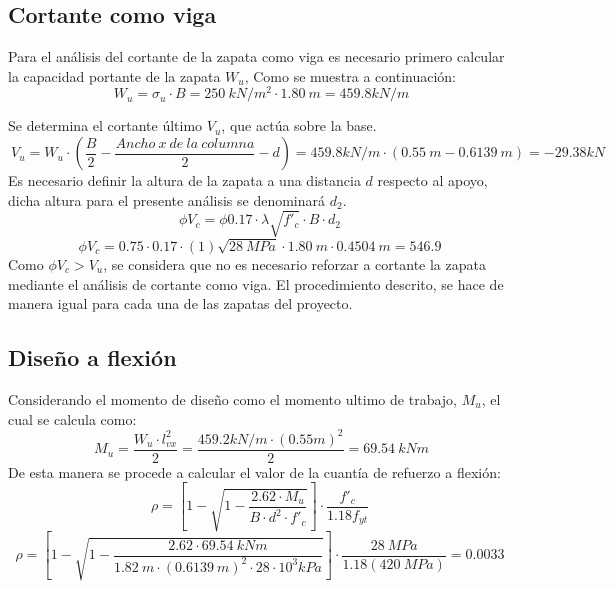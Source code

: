 \documentclass[12pt]{article}
\begin{document}
\subsection{Cortante como viga}
Para el análisis del cortante de la zapata como viga es necesario primero calcular la capacidad portante de la zapata $W_{u}$, Como se muestra a continuación:
\begin{equation*}
    \ W_{u}=\sigma_{u}\cdot B = 250~kN/m^2\cdot1.80~m=459.8 kN/m
\end{equation*}

Se determina el cortante último $V_{u}$, que actúa sobre la base.
\begin{equation*}
    \ V_{u}=W_{u}\cdot \left(\frac{B}{2}-\frac{Ancho~x~de~la~columna}{2}-d \right)=459.8 kN/m\cdot(0.55~m-0.6139~m)=-29.38kN
\end{equation*}
Es necesario definir la altura de la zapata a una distancia $d$  respecto al apoyo, dicha altura para el presente análisis se denominará $d_{2}$.
\begin{equation*}
    \phi V_{c}=\phi 0.17\cdot\lambda\sqrt{f'_{c}}\cdot B \cdot d_{2}
\end{equation*}
\begin{equation*}
    \phi V_{c}=0.75\cdot 0.17\cdot(1)\sqrt{28~MPa}\cdot 1.80~m \cdot 0.4504~m=546.9 
\end{equation*}
Como $\phi V_{c}>V_{u}$, se considera que no es necesario reforzar a cortante la zapata  mediante el análisis de cortante como viga.
El procedimiento descrito, se hace de manera igual para cada una de las zapatas del proyecto.
\subsection{Diseño a flexión}
Considerando el momento de diseño como el momento ultimo de trabajo, $M_{u}$,  el cual se calcula como:
\begin{equation*}
    \ M_{u}=\frac{W_{u}\cdot l_{vx}^2}{2}=\frac{459.2kN/m\cdot(0.55m)^2}{2}=69.54~kNm
\end{equation*}
De esta manera se procede a calcular el valor de la cuantía de refuerzo a flexión:
\begin{equation*}
    \rho=\left[1-\sqrt{1-\frac{2.62\cdot M_{u}}{B\cdot d^2\cdot f'_{c}}}\right]\cdot \frac{f'_{c}}{1.18 f_{yt}}
\end{equation*}
\begin{equation*}
    \rho=\left[1-\sqrt{1-\frac{2.62\cdot 69.54~kNm}{1.82~m\cdot (0.6139~m)^2\cdot 28\cdot 10^3 kPa}}\right]\cdot \frac{28~MPa}{1.18 (420~MPa)}=0.0033
\end{equation*}
\end{document}

